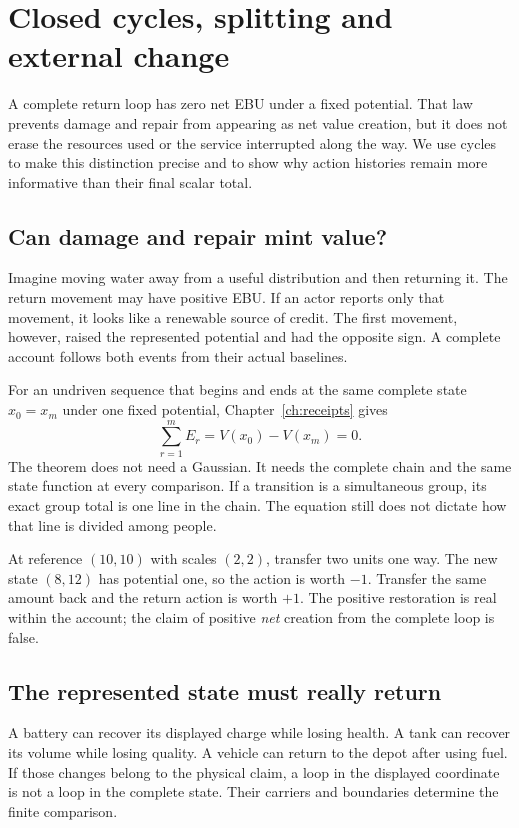 \chapter{Closed cycles, splitting and external change}\label{ch:cycles}

A complete return loop has zero net EBU under a fixed potential. That law prevents damage and repair from appearing as net value creation, but it does not erase the resources used or the service interrupted along the way. We use cycles to make this distinction precise and to show why action histories remain more informative than their final scalar total.


\section{Can damage and repair mint value?}
Imagine moving water away from a useful distribution and then returning it.
The return movement may have positive EBU. If an actor reports only that
movement, it looks like a renewable source of credit. The first movement,
however, raised the represented potential and had the opposite sign. A
complete account follows both events from their actual baselines.

For an undriven sequence that begins and ends at the same complete state
$x_0=x_m$ under one fixed potential, Chapter~\ref{ch:receipts} gives
\begin{equation}\label{eq:cycle}
 \sum_{r=1}^m E_r=V(x_0)-V(x_m)=0.
\end{equation}
The theorem does not need a Gaussian. It needs the complete chain and the
same state function at every comparison. If a transition is a simultaneous
group, its exact group total is one line in the chain. The equation still
does not dictate how that line is divided among people.

At reference $(10,10)$ with scales $(2,2)$, transfer two units one way.
The new state $(8,12)$ has potential one, so the action is worth $-1$.
Transfer the same amount back and the return action is worth $+1$. The
positive restoration is real within the account; the claim of positive
\emph{net} creation from the complete loop is false.

\section{The represented state must really return}
A battery can recover its displayed charge while losing health. A tank can recover its volume while losing quality. A vehicle can return to the depot after using fuel. If those changes belong to the physical claim, a loop in the displayed coordinate is not a loop in the complete state. Their carriers and boundaries determine the finite comparison.

